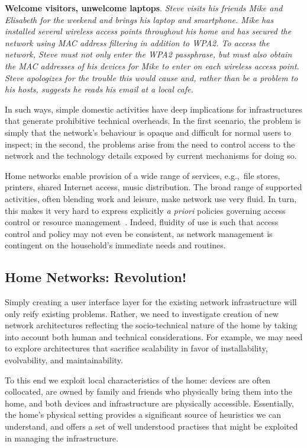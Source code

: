 \textbf{Welcome visitors, unwelcome laptops}.  
{\it Steve visits his friends Mike and Elisabeth for the weekend and
brings his laptop and smartphone.  Mike has installed several wireless
access points throughout his home and has secured the network using
MAC address filtering in addition to WPA2.  To access the network,
Steve must not only enter the WPA2 passphrase, but must also obtain
the MAC addresses of his devices for Mike to enter on each wireless
access point.  Steve apologizes for the trouble this would cause and,
rather than be a problem to his hosts, suggests he reads his email at
a local cafe.} 

In such ways, simple domestic activities have deep implications for
infrastructures that generate prohibitive technical overheads.  In the
first scenario, the problem is simply that the network's behaviour is
opaque and difficult for normal users to inspect; in the second, the
problems arise from the need to control access to the network and the
technology details exposed by current mechanisms for doing so.  

Home networks enable provision of a wide range of services, e.g.,~file
stores, printers, shared Internet access, music distribution.  The
broad range of supported activities, often blending work and leisure,
make network use very fluid.  In turn, this makes it very hard to
express explicitly \emph{a priori} policies governing access control
or resource management~\cite{tolmie07:_makin}.  Indeed, fluidity of
use is such that access control and policy may not even be consistent,
as network management is contingent on the household's immediate needs
and routines.

\subsection{Home Networks: Revolution!}
\label{s:revolution}

Simply creating a user interface layer for the existing network
infrastructure will only reify existing problems.  Rather, we need to
investigate creation of new network architectures reflecting the
socio-technical nature of the home by taking into account both human
and technical considerations.  For example, we may need to explore
architectures that sacrifice scalability in favor of installability,
evolvability, and maintainability.  

To this end we exploit local
characteristics of the home: devices are often collocated, are owned
by family and friends who physically bring them into the home, and
both devices and infrastructure are physically accessible.
Essentially, the home's physical setting provides a significant source
of heuristics we can understand, and offers a set of well understood
practises that might be exploited in managing the infrastructure.  

